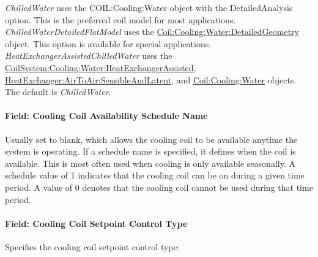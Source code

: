 \emph{ChilledWater} uses the COIL:Cooling:Water object with the DetailedAnalysis option. This is the preferred coil model for most applications. \emph{ChilledWaterDetailedFlatModel} uses the \hyperref[coilcoolingwaterdetailedgeometry]{Coil:Cooling:Water:DetailedGeometry} object. This option is available for special applications. \emph{HeatExchangerAssistedChilledWater} uses the \hyperref[coilsystemcoolingwaterheatexchangerassisted]{CoilSystem:Cooling:Water:HeatExchangerAssisted}, \hyperref[heatexchangerairtoairsensibleandlatent]{HeatExchanger:AirToAir:SensibleAndLatent}, and \hyperref[coilcoolingwater]{Coil:Cooling:Water} objects. The default is \emph{ChilledWater}.

\paragraph{Field: Cooling Coil Availability Schedule Name}\label{field-cooling-coil-availability-schedule-name-9}

Usually set to blank, which allows the cooling coil to be available anytime the system is operating. If a schedule name is specified, it defines when the coil is available. This is most often used when cooling is only available seasonally. A schedule value of 1 indicates that the cooling coil can be on during a given time period. A value of 0 denotes that the cooling coil cannot be used during that time period.

\paragraph{Field: Cooling Coil Setpoint Control Type}\label{field-cooling-coil-setpoint-control-type}

Specifies the cooling coil setpoint control type:

